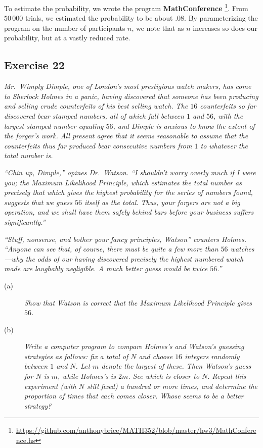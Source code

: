 \documentclass{tufte-handout}
\begin{document}
To estimate the probability, we wrote the program
\textbf{\mbox{MathConference}}%
\footnote{\url{https://github.com/anthonybrice/MATH352/blob/master/hw3/MathConference.hs}}. From
$50\,000$ trials, we estimated the probability to be about $.08$. By
parameterizing the program on the number of participants $n$, we note
that as $n$ increases so does our probability, but at a vastly reduced
rate.

\subsection{Exercise 22}
\begin{description}
\item \emph{Mr.~Wimply Dimple, one of London's most prestigious watch
    makers, has come to Sherlock Holmes in a panic, having discovered
    that someone has been producing and selling crude counterfeits of
    his best selling watch. The $16$ counterfeits so far discovered
    bear stamped numbers, all of which fall between $1$ and $56$, with
    the largest stamped number equaling $56$, and Dimple is anxious to
    know the extent of the forger's work. All present agree that it
    seems reasonable to assume that the counterfeits thus far produced
    bear consecutive numbers from $1$ to whatever the total number
    is.}

  \emph{``Chin up, Dimple,'' opines Dr.~Watson. ``I shouldn't worry
    overly much if I were you; the Maximum Likelihood Principle, which
    estimates the total number as precisely that which gives the
    highest probability for the series of numbers found, suggests that
    we guess $56$ itself as the total. Thus, your forgers are not a
    big operation, and we shall have them safely behind bars before
    your business suffers significantly.''}

  \emph{``Stuff, nonsense, and bother your fancy principles, Watson''
    counters Holmes. ``Anyone can see that, of course, there must be
    quite a few more than $56$ watches---why the odds of our having
    discovered precisely the highest numbered watch made are laughably
    negligible. A much better guess would be twice $56$.''}

  \begin{description}
  \item[(a)] \emph{Show that Watson is correct that the Maximum
      Likelihood Principle gives $56$.}
  \item[(b)] \emph{Write a computer program to compare Holmes's and
      Watson's guessing strategies as follows: fix a total of $N$ and
      choose $16$ integers randomly between $1$ and $N$. Let $m$
      denote the largest of these. Then Watson's guess for $N$ is $m$,
      while Holmes's is $2m$. See which is closer to $N$. Repeat this
      experiment (with $N$ still fixed) a hundred or more times, and
      determine the proportion of times that each comes closer. Whose
      seems to be a better strategy?}
  \end{description}
\end{description}
\end{document}
